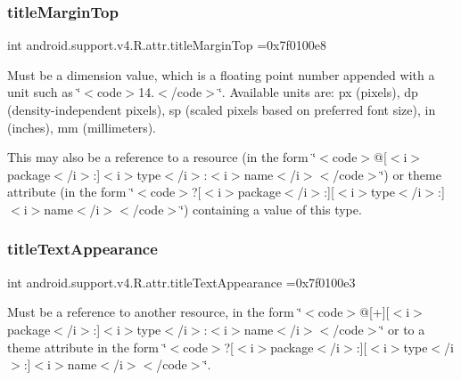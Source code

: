 \subsubsection{\texorpdfstring{title\+Margin\+Top}{titleMarginTop}}
{\footnotesize\ttfamily int android.\+support.\+v4.\+R.\+attr.\+title\+Margin\+Top =0x7f0100e8\hspace{0.3cm}{\ttfamily [static]}}

Must be a dimension value, which is a floating point number appended with a unit such as \char`\"{}$<$code$>$14.\+5sp$<$/code$>$\char`\"{}. Available units are\+: px (pixels), dp (density-\/independent pixels), sp (scaled pixels based on preferred font size), in (inches), mm (millimeters). 

This may also be a reference to a resource (in the form \char`\"{}$<$code$>$@\mbox{[}$<$i$>$package$<$/i$>$\+:\mbox{]}$<$i$>$type$<$/i$>$\+:$<$i$>$name$<$/i$>$$<$/code$>$\char`\"{}) or theme attribute (in the form \char`\"{}$<$code$>$?\mbox{[}$<$i$>$package$<$/i$>$\+:\mbox{]}\mbox{[}$<$i$>$type$<$/i$>$\+:\mbox{]}$<$i$>$name$<$/i$>$$<$/code$>$\char`\"{}) containing a value of this type. \mbox{\label{classandroid_1_1support_1_1v4_1_1R_1_1attr_abcf9d1c52112fe1f7d6defda965edf39}} 
\subsubsection{\texorpdfstring{title\+Text\+Appearance}{titleTextAppearance}}
{\footnotesize\ttfamily int android.\+support.\+v4.\+R.\+attr.\+title\+Text\+Appearance =0x7f0100e3\hspace{0.3cm}{\ttfamily [static]}}

Must be a reference to another resource, in the form \char`\"{}$<$code$>$@\mbox{[}+\mbox{]}\mbox{[}$<$i$>$package$<$/i$>$\+:\mbox{]}$<$i$>$type$<$/i$>$\+:$<$i$>$name$<$/i$>$$<$/code$>$\char`\"{} or to a theme attribute in the form \char`\"{}$<$code$>$?\mbox{[}$<$i$>$package$<$/i$>$\+:\mbox{]}\mbox{[}$<$i$>$type$<$/i$>$\+:\mbox{]}$<$i$>$name$<$/i$>$$<$/code$>$\char`\"{}. \mbox{\label{classandroid_1_1support_1_1v4_1_1R_1_1attr_a82b688a0bd0ebfb31f60e9f59a5191fe}} 
